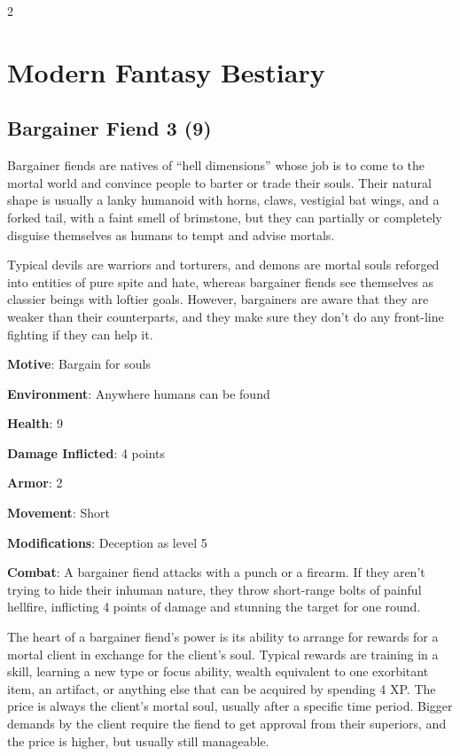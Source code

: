 \begin{multicols}{2}

\chapter{Modern Fantasy Bestiary}

\section{Bargainer Fiend 3 (9)}

Bargainer fiends are natives of “hell dimensions” whose job is to come to the mortal world and convince people to barter or trade their souls. Their natural shape is usually a lanky humanoid with horns, claws, vestigial bat wings, and a forked tail, with a faint smell of brimstone, but they can partially or completely disguise themselves as humans to tempt and advise mortals. 

Typical devils are warriors and torturers, and demons are mortal souls reforged into entities of pure spite and hate, whereas bargainer fiends see themselves as classier beings with loftier goals. However, bargainers are aware that they are weaker than their counterparts, and they make sure they don’t do any front-line fighting if they can help it.

\textbf{Motive}: Bargain for souls 

\textbf{Environment}: Anywhere humans can be found 

\textbf{Health}: 9 

\textbf{Damage Inflicted}: 4 points 

\textbf{Armor}: 2 

\textbf{Movement}: Short 

\textbf{Modifications}: Deception as level 5 

\textbf{Combat}: A bargainer fiend attacks with a punch or a firearm. If they aren’t trying to hide their inhuman nature, they throw short-range bolts of painful hellfire, inflicting 4 points of damage and stunning the target for one round. 

The heart of a bargainer fiend’s power is its ability to arrange for rewards for a mortal client in exchange for the client’s soul. Typical rewards are training in a skill, learning a new type or focus ability, wealth equivalent to one exorbitant item, an artifact, or anything else that can be acquired by spending 4 XP. The price is always the client’s mortal soul, usually after a specific time period. Bigger demands by the client require the fiend to get approval from their superiors, and the price is higher, but usually still manageable. 


\end{multicols}

